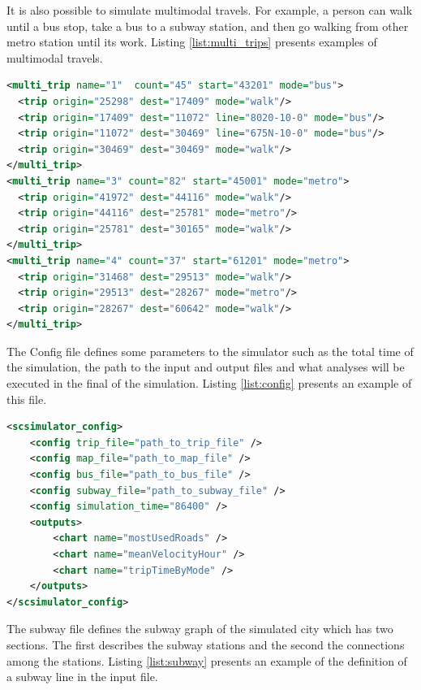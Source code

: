 It is also possible to simulate multimodal travels. For example, a person can walk until a bus stop, take a bus to a subway station, and then go walking from other metro station until its work. Listing \ref{list:multi_trips} presents examples of multimodal travels.

\renewcommand{\thelstlisting}{\arabic{lstlisting}}
\lstset{language=XML}
\begin{lstlisting}[language=xml, caption=Multi-Trip file, label=list:multi_trips, upquote=true]
<multi_trip name="1"  count="45" start="43201" mode="bus">
  <trip origin="25298" dest="17409" mode="walk"/>
  <trip origin="17409" dest="11072" line="8020-10-0" mode="bus"/>
  <trip origin="11072" dest="30469" line="675N-10-0" mode="bus"/>
  <trip origin="30469" dest="30469" mode="walk"/>
</multi_trip>
<multi_trip name="3" count="82" start="45001" mode="metro">
  <trip origin="41972" dest="44116" mode="walk"/>
  <trip origin="44116" dest="25781" mode="metro"/>
  <trip origin="25781" dest="30165" mode="walk"/>
</multi_trip>
<multi_trip name="4" count="37" start="61201" mode="metro">
  <trip origin="31468" dest="29513" mode="walk"/>
  <trip origin="29513" dest="28267" mode="metro"/>
  <trip origin="28267" dest="60642" mode="walk"/>
</multi_trip>
\end{lstlisting}


The Config file defines some parameters to the simulator such as the total time of the simulation, the path to the input and output files and what analyses will be executed in the final of the simulation. Listing \ref{list:config} presents an example of this file.

\renewcommand{\thelstlisting}{\arabic{lstlisting}}
\lstset{language=XML}
\begin{lstlisting}[language=xml, caption=File with the simulator configurations, label=list:config, upquote=true]
<scsimulator_config>
    <config trip_file="path_to_trip_file" />
    <config map_file="path_to_map_file" />
    <config bus_file="path_to_bus_file" />
    <config subway_file="path_to_subway_file" />
    <config simulation_time="86400" />
    <outputs>
        <chart name="mostUsedRoads" />
        <chart name="meanVelocityHour" />
        <chart name="tripTimeByMode" />
    </outputs>
</scsimulator_config>
\end{lstlisting}

The subway file defines the subway graph of the simulated city which has two sections. The first describes the subway stations and the second the connections among the stations. Listing \ref{list:subway} presents an example of the definition of a subway line in the input file.

